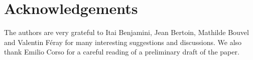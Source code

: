 \documentclass[11pt,a4paper,oneside]{article}
\theoremstyle{definition}
\theoremstyle{remark}
\begin{document}
\section*{Acknowledgements}
The authors are very grateful to Itai Benjamini, Jean Bertoin, Mathilde Bouvel and Valentin F\'eray for many interesting suggestions and discussions. 
We also thank Emilio Corso for a careful reading of a preliminary draft of the paper.



\end{document}
